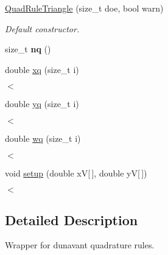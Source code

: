 \begin{DoxyCompactItemize}
\item 
\hyperlink{classMeshFramework2D_1_1QuadRuleTriangle_a83a432b56c03fffa615ec85f5dfd57d7}{Quad\+Rule\+Triangle} (size\+\_\+t doe, bool warn)
\begin{DoxyCompactList}\small\item\em Default constructor. \end{DoxyCompactList}\item 
\mbox{\label{classMeshFramework2D_1_1QuadRuleTriangle_a5071f69f8f99171329a13943d5fe515d}} 
size\+\_\+t {\bfseries nq} ()
\item 
double \hyperlink{classMeshFramework2D_1_1QuadRuleTriangle_a98156eda410a5aa6f9787ce920358fca}{xq} (size\+\_\+t i)
\begin{DoxyCompactList}\small\item\em $<$ \end{DoxyCompactList}\item 
\mbox{\label{classMeshFramework2D_1_1QuadRuleTriangle_a0aa8f08c87bc5b2bc8180c149e16a4c2}} 
double \hyperlink{classMeshFramework2D_1_1QuadRuleTriangle_a0aa8f08c87bc5b2bc8180c149e16a4c2}{yq} (size\+\_\+t i)
\begin{DoxyCompactList}\small\item\em $<$ \end{DoxyCompactList}\item 
\mbox{\label{classMeshFramework2D_1_1QuadRuleTriangle_a47725c429eec36e849a8bbf69a924303}} 
double \hyperlink{classMeshFramework2D_1_1QuadRuleTriangle_a47725c429eec36e849a8bbf69a924303}{wq} (size\+\_\+t i)
\begin{DoxyCompactList}\small\item\em $<$ \end{DoxyCompactList}\item 
void \hyperlink{classMeshFramework2D_1_1QuadRuleTriangle_aa2cd3081837b1cb46f6573ceb16de7b2}{setup} (double xV\mbox{[}$\,$\mbox{]}, double yV\mbox{[}$\,$\mbox{]})
\begin{DoxyCompactList}\small\item\em $<$ \end{DoxyCompactList}\end{DoxyCompactItemize}


\subsection{Detailed Description}
Wrapper for dunavant quadrature rules. 

